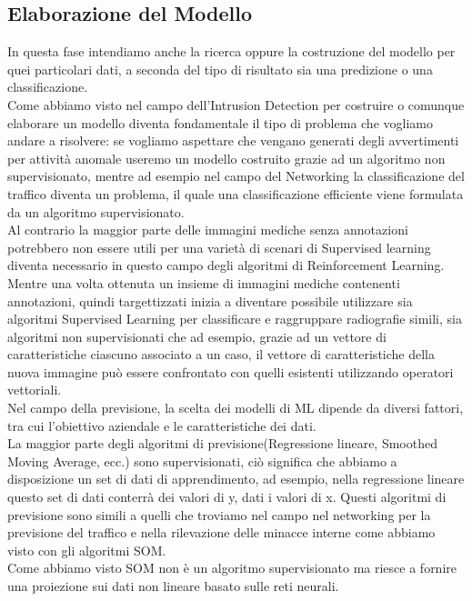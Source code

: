 \documentclass[../tesi.tex]{subfiles}
\begin{document}
\subsection{Elaborazione del Modello}
In questa fase intendiamo anche la ricerca oppure la costruzione del modello per quei particolari dati, a seconda del tipo di risultato sia una predizione o una classificazione.\\
Come abbiamo visto nel campo dell’Intrusion Detection per costruire o comunque elaborare un modello diventa fondamentale il tipo di problema che vogliamo andare a risolvere:
se vogliamo aspettare che vengano generati degli avvertimenti per attività anomale useremo un modello costruito grazie ad un algoritmo non supervisionato, mentre ad esempio nel campo del Networking la classificazione del traffico diventa un problema, il quale una classificazione efficiente viene formulata da un algoritmo supervisionato.\\
Al contrario la maggior parte delle immagini mediche senza annotazioni potrebbero non essere utili per una varietà di scenari di Supervised learning diventa necessario in questo campo degli algoritmi di Reinforcement Learning.\\
Mentre una volta ottenuta un insieme di immagini mediche contenenti annotazioni, quindi targettizzati inizia a diventare possibile utilizzare sia algoritmi Supervised Learning per classificare e raggruppare radiografie simili, sia algoritmi non supervisionati che ad esempio, grazie ad un vettore di caratteristiche ciascuno associato a un caso, il vettore di caratteristiche della nuova immagine può essere confrontato con quelli esistenti utilizzando operatori vettoriali.\\
Nel campo della previsione, la scelta dei modelli di ML dipende da diversi fattori, tra cui l’obiettivo aziendale e le caratteristiche dei dati.\\
La maggior parte degli algoritmi di previsione(Regressione lineare, Smoothed Moving Average, ecc.) sono supervisionati, ciò significa che abbiamo a disposizione un set di dati di apprendimento, ad esempio, nella regressione lineare questo set di dati conterrà dei valori di y, dati i valori di x. Questi algoritmi di previsione sono simili a quelli che troviamo nel campo nel networking per la previsione del traffico e nella rilevazione delle minacce interne come abbiamo visto con gli algoritmi SOM.\\
Come abbiamo visto SOM non è un algoritmo supervisionato ma riesce a fornire una proiezione sui dati non lineare basato sulle reti neurali.
\newpage
\end{document}
